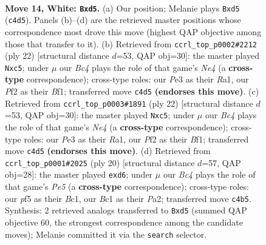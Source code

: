 \documentclass[11pt]{article}
\begin{document}
\clearpage

\begin{figure}[p]\centering
\begin{subfigure}{0.46\textwidth}\centering
\resizebox{\linewidth}{!}{%
\newchessgame
\chessboard[
  setfen={r1b1kb1r/ppq3pp/2p1p3/3nNp2/2BP4/1Q2P3/PP3PPP/R1B1K2R w KQ - 2 14},
  showmover=false,
  pgfstyle=straightmove, color=movearrow, markmove={c4-d5}
]}
\caption{}
\end{subfigure}\hfill
\begin{subfigure}{0.46\textwidth}\centering
\resizebox{\linewidth}{!}{%
\newchessgame
\chessboard[
  setfen={r1b1k2r/2qp1ppp/pp2p3/2bnP3/P3NP2/8/1PPQ2PP/R1B1KB1R w KQkq - 0 12},
  showmover=false,
  pgfstyle=straightmove, color=movearrow, markmove={e4-c5}
]}
\caption{}
\end{subfigure}
\\[4pt]
\begin{subfigure}{0.46\textwidth}\centering
\resizebox{\linewidth}{!}{%
\newchessgame
\chessboard[
  setfen={r1b1k2r/2qp1ppp/pp2p3/2bnP3/P3NP2/8/1PPQ2PP/R1B1KB1R w KQkq - 0 12},
  showmover=false,
  pgfstyle=straightmove, color=movearrow, markmove={e4-c5}
]}
\caption{}
\end{subfigure}\hfill
\begin{subfigure}{0.46\textwidth}\centering
\resizebox{\linewidth}{!}{%
\newchessgame
\chessboard[
  setfen={r1bqkb1r/5pp1/p1ppp2p/3nP3/6P1/2N4P/PPP2PB1/R1BQK2R w KQkq - 1 11},
  showmover=false,
  pgfstyle=straightmove, color=movearrow, markmove={e5-d6}
]}
\caption{}
\end{subfigure}
\caption{\textbf{Move 14, White: \texttt{Bxd5}.} (a) Our position; Melanie plays \texttt{Bxd5} (\texttt{c4d5}). Panels (b)--(d) are the retrieved master positions whose correspondence most drove this move (highest QAP objective among those that transfer to it). (b) Retrieved from \texttt{ccrl\_top\_p0002\#2212} (ply 22) [structural distance $d$=53, QAP obj=30]: the master played \texttt{Nxc5}; under $\mu$ our \emph{Bc4} plays the role of that game's \emph{Ne4} (a \textbf{cross-type} correspondence); cross-type roles: our \emph{P}e3 as their \emph{R}a1, our \emph{P}f2 as their \emph{B}f1; transferred move \texttt{c4d5} \textbf{(endorses this move)}. (c) Retrieved from \texttt{ccrl\_top\_p0003\#1891} (ply 22) [structural distance $d$=53, QAP obj=30]: the master played \texttt{Nxc5}; under $\mu$ our \emph{Bc4} plays the role of that game's \emph{Ne4} (a \textbf{cross-type} correspondence); cross-type roles: our \emph{P}e3 as their \emph{R}a1, our \emph{P}f2 as their \emph{B}f1; transferred move \texttt{c4d5} \textbf{(endorses this move)}. (d) Retrieved from \texttt{ccrl\_top\_p0001\#2025} (ply 20) [structural distance $d$=57, QAP obj=28]: the master played \texttt{exd6}; under $\mu$ our \emph{Bc4} plays the role of that game's \emph{Pe5} (a \textbf{cross-type} correspondence); cross-type roles: our \emph{p}f5 as their \emph{B}c1, our \emph{B}c1 as their \emph{P}a2; transferred move \texttt{c4b5}. Synthesis: 2 retrieved analogs transferred to \texttt{Bxd5} (summed QAP objective 60, the strongest correspondence among the candidate moves); Melanie committed it via the \texttt{search} selector.}
\label{fig:thought-m26}
\end{figure}
\end{document}

